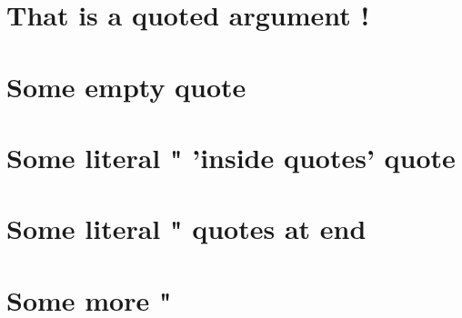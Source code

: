 \chapter{That is a quoted argument !}
\label{s:1}
\chapter{Some empty  quote}
\label{s:2}
\chapter{Some literal " 'inside quotes' quote}
\label{s:3}
\chapter{Some literal " quotes at end}
\label{s:4}
\chapter{Some more "}
\label{s:5}
